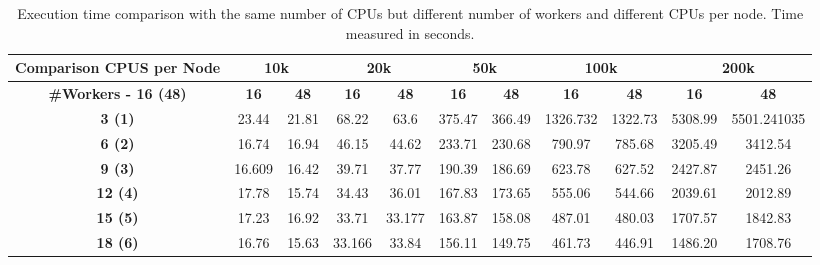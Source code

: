 \documentclass[10pt,journal,compsoc]{IEEEtran}
\let\MYoriglatexcaption\caption
\renewcommand{\caption}[2][\relax]{\MYoriglatexcaption[#2]{#2}}
\begin{document}
\begin{table*}[!ht]
\centering
\caption{Execution time comparison with the same number of CPUs but different number of workers and different CPUs per node. Time measured in seconds.}
\label{cpusComparison}
\begin{tabular*}{.95\textwidth}{c|cc|cc|cc|cc|cc}
\textbf{Comparison CPUS per Node} & \multicolumn{2}{c|}{\textbf{10k}} & \multicolumn{2}{c|}{\textbf{20k}} & \multicolumn{2}{c|}{\textbf{50k}} & \multicolumn{2}{c|}{\textbf{100k}} &
\multicolumn{2}{c}{\textbf{200k}}
\\ \hline
\textbf{\#Workers - 16 (48)}      & \textbf{16}     & \textbf{48}     & \textbf{16}     & \textbf{48}     & \textbf{16}     & \textbf{48}     & \textbf{16}      & \textbf{48}   & \textbf{16}     & \textbf{48}  \\ \hline
\textbf{3 (1)}                    & 23.44           & 21.81           & 68.22           & 63.6            & 375.47          & 366.49          & 1326.732         & 1322.73  & 5308.99 & 5501.241035    \\
\textbf{6 (2)}                    & 16.74           & 16.94           & 46.15           & 44.62           & 233.71          & 230.68          & 790.97           & 785.68   & 3205.49 & 3412.54       \\
\textbf{9 (3)}                    & 16.609          & 16.42           & 39.71           & 37.77           & 190.39          & 186.69          & 623.78           & 627.52   & 2427.87 & 2451.26       \\
\textbf{12 (4)}                   & 17.78           & 15.74           & 34.43           & 36.01           & 167.83          & 173.65          & 555.06           & 544.66    & 2039.61 & 2012.89      \\
\textbf{15 (5)}                   & 17.23           & 16.92           & 33.71           & 33.177          & 163.87          & 158.08          & 487.01           & 480.03     & 1707.57 & 1842.83     \\
\textbf{18 (6)}                   & 16.76           & 15.63           & 33.166          & 33.84           & 156.11          & 149.75          & 461.73           & 446.91   & 1486.20 & 1708.76      
\end{tabular*}
\end{table*}
\end{document}
